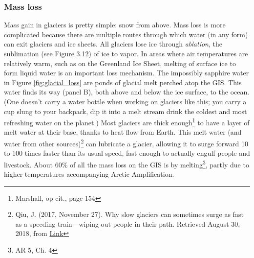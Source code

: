 \documentclass[amstex,12pt]{book}
\begin{document}
\subsubsection{Mass loss} Mass gain in glaciers is pretty simple: snow from above. Mass loss is more complicated because there are multiple routes through which water (in any form) can exit glaciers and ice sheets. All glaciers lose ice through \emph{ablation}, the sublimation (see Figure 3.12) of ice to vapor. In areas where air temperatures are relatively warm, such as on the Greenland Ice Sheet, melting of surface ice to form liquid water is an important loss mechanism. The impossibly sapphire water in Figure \ref{fig:glacial_loss} are ponds of glacial melt perched atop the GIS. This water finds its way (panel B), both above and below the ice surface, to the ocean. (One doesn't carry a water bottle when working on glaciers like this; you carry a cup slung to your backpack, dip it into a melt stream drink the coldest and most refreshing water on the planet.) Most glaciers are thick enough\footnote{Marshall, op cit., page 154} to have a layer of melt water at their base, thanks to heat flow from Earth. This melt water (and water from other sources)\footnote{Qiu, J. (2017, November 27). Why slow glaciers can sometimes surge as fast as a speeding train—wiping out people in their path. Retrieved August 30, 2018, from \href{http://www.sciencemag.org/news/2017/11/why-slow-glaciers-can-sometimes-surge-fast-speeding-train-wiping-out-people-their-path}{Link}} can lubricate a glacier, allowing it to surge forward 10 to 100 times faster than its usual speed, fast enough to actually engulf people and livestock. About 60\% of all the mass loss on the GIS is by melting\footnote{AR 5, Ch. 4}, partly due to higher temperatures accompanying Arctic Amplification.\\
\end{document}

